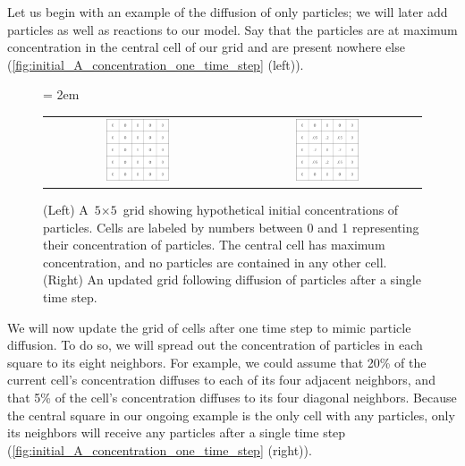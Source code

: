 Let us begin with an example of the diffusion of only  particles; we will later add  particles as well as reactions to our model. Say that the particles are at maximum concentration in the central cell of our grid and are present nowhere else (\autoref{fig:initial_A_concentration_one_time_step} (left)).\\

\begin{figure}[h]
\centering
\mySfFamily
\tabcolsep = 2em
\begin{tabular}{c c}
\includegraphics[width = 0.35\textwidth]{../images/initial_A_concentration.png} & \includegraphics[width = 0.35\textwidth]{../images/A_concentration_one_time_step.png}
\end{tabular}
\caption{(Left) A $\text{5} \times \text{5}$ grid showing hypothetical initial concentrations of  particles. Cells are labeled by numbers between 0 and 1 representing their concentration of  particles. The central cell has maximum concentration, and no particles are contained in any other cell. (Right) An updated grid following diffusion of particles after a single time step.}
\label{fig:initial_A_concentration_one_time_step}
\end{figure}

We will now update the grid of cells after one time step to mimic particle diffusion. To do so, we will spread out the concentration of particles in each square to its eight neighbors. For example, we could assume that 20\% of the current cell's concentration diffuses to each of its four adjacent neighbors, and that 5\% of the cell's concentration diffuses to its four diagonal neighbors. Because the central square in our ongoing example is the only cell with any particles, only its neighbors will receive any particles after a single time step (\autoref{fig:initial_A_concentration_one_time_step} (right)).\\

